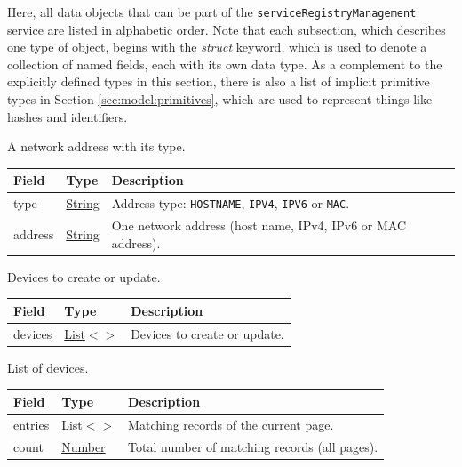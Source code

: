 \documentclass[a4paper]{arrowhead}
\newcommand{\mref}[2][]{{\textcolor{ArrowheadPurple}{\hyperref[sec:model:#2]{\ifstrempty{#1}{#2}{#1}}}}}
\newcommand{\pref}[1]{{\textcolor{ArrowheadGrey}{\hyperref[sec:model:primitives:#1]{#1}}}}
\begin{document}
Here, all data objects that can be part of the \texttt{service\allowbreak{}Registry\allowbreak{}Management} service are listed in alphabetic order.
Note that each subsection, which describes one type of object, begins with the \textit{struct} keyword, which is used to denote a collection of named fields, each with its own data type.
As a complement to the explicitly defined types in this section, there is also a list of implicit primitive types in Section \ref{sec:model:primitives}, which are used to represent things like hashes and identifiers.


A network address with its type.


\noindent\begin{tabularx}{\textwidth}{| >{\raggedright\arraybackslash}p{3.9cm} | >{\raggedright\arraybackslash\small}p{5.3cm} | X |} \hline
\rowcolor{gray!33} Field & Type & Description \\ \hline
type & \pref{String} & Address type: \texttt{HOSTNAME}, \texttt{IPV4}, \texttt{IPV6} or \texttt{MAC}. \\ \hline
address & \pref{String} & One network address (host name, IPv4, IPv6 or MAC address). \\ \hline
\end{tabularx}




Devices to create or update.


\noindent\begin{tabularx}{\textwidth}{| >{\raggedright\arraybackslash}p{3.9cm} | >{\raggedright\arraybackslash\small}p{5.3cm} | X |} \hline
\rowcolor{gray!33} Field & Type & Description \\ \hline
devices & \pref{List}$<$\allowbreak{}\mref{DeviceRequest}$>$ & Devices to create or update. \\ \hline
\end{tabularx}




List of devices.


\noindent\begin{tabularx}{\textwidth}{| >{\raggedright\arraybackslash}p{3.9cm} | >{\raggedright\arraybackslash\small}p{5.3cm} | X |} \hline
\rowcolor{gray!33} Field & Type & Description \\ \hline
entries & \pref{List}$<$\allowbreak{}\mref{DeviceResponse}$>$ & Matching records of the current page. \\ \hline
count & \pref{Number} & Total number of matching records (all pages). \\ \hline
\end{tabularx}
\end{document}
